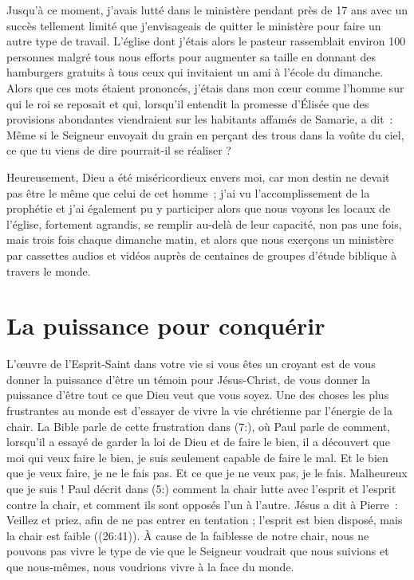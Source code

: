 Jusqu'à ce moment, j'avais lutté dans le ministère pendant près de 17 ans
 avec un succès tellement limité que j'envisageais de quitter le ministère
 pour faire un autre type de travail.
 L'église dont j'étais alors le pasteur rassemblait environ 100 personnes
 malgré tous nous efforts pour augmenter sa taille en donnant des hamburgers
 gratuits à tous ceux qui invitaient un ami à l'école du dimanche.
 Alors que ces mots étaient prononcés, j'étais dans mon cœur comme l'homme
 sur qui le roi se reposait et qui, lorsqu'il entendit la promesse d'Élisée
 que des provisions abondantes viendraient sur les habitants affamés
 de Samarie, a dit~:
 \og Même si le Seigneur envoyait du grain en perçant des trous dans
 la voûte du ciel, ce que tu viens de dire pourrait-il se réaliser ? \fg{}

Heureusement, Dieu a été miséricordieux envers moi,
 car mon destin ne devait pas être le même que celui de cet homme~;
 j'ai vu l'ac\-com\-plis\-sement de la prophétie et j'ai également pu y participer
 alors que nous voyons les locaux de l'église, fortement agrandis,
 se remplir au-delà de leur capacité, non pas une fois, mais trois fois
 chaque dimanche matin, et alors que nous exerçons un ministère
 par cassettes audios et vidéos auprès de centaines de groupes
 d'étude biblique à travers le monde.

\section*{La puissance pour conquérir}

L'œuvre de l'Esprit-Saint dans votre vie si vous êtes un croyant
 est de vous donner la puissance d'être un témoin pour Jésus-Christ,
 de vous donner la puissance d'être tout ce que Dieu veut que vous soyez.
 Une des choses les plus frustrantes au monde est d'essayer
 de vivre la vie chrétienne par l'énergie de la chair.
 La Bible parle de cette frustration dans (7:),
 où Paul parle de comment, lorsqu'il a essayé de garder la loi de Dieu
 et de faire le bien, il a découvert que \og moi qui veux faire le bien,
 je suis seulement capable de faire le mal. Et le bien que je veux faire,
 je ne le fais pas. Et ce que je ne veux pas, je le fais.
 Malheureux que je suis ! \fg{}
 Paul décrit dans (5:) comment la chair lutte avec l'esprit
 et l'esprit contre la chair, et comment ils sont opposés l'un à l'autre.
 Jésus a dit à Pierre~:
 \og Veillez et priez, afin de ne pas entrer en tentation ;
 l'esprit est bien disposé, mais la chair est faible \fg{}
 ((26:41)).
 À cause de la faiblesse de notre chair, nous ne pouvons pas vivre
 le type de vie que le Seigneur voudrait que nous suivions
 et que nous-mêmes, nous voudrions vivre à la face du monde.

